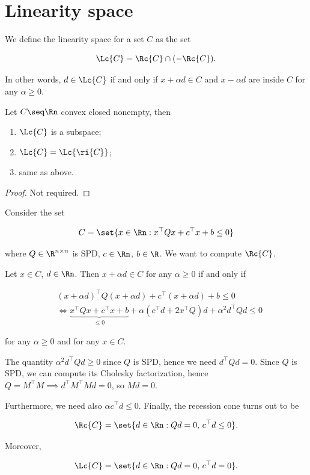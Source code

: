 \section{Linearity space}

We define the linearity space for a set $C$ as the set 

\[ \Lc{C} = \Rc{C} \cap (-\Rc{C}). \]

In other words, $d \in \Lc{C}$ if and only if $x + \alpha d \in C$ and $x - \alpha d$ are inside $C$ for any $\alpha \ge 0$.

\begin{proposition}[Properties of $\Lc{C}$]
    
    Let $C \seq \Rn$ convex closed nonempty, then 

    \begin{enumerate}
        \item $\Lc{C}$ is a subspace;
        \item $\Lc{C} = \Lc{\ri{C}}$;
        \item same as above.
    \end{enumerate}

\end{proposition}

\begin{proof}
    Not required.
\end{proof}

\begin{example}[Important!]
    
    Consider the set 

    \[ C = \set{x \in \Rn : x^\top Q x + c^\top x + b \le 0} \]

    where $Q \in \R^{n \times n}$ is SPD, $c \in \Rn$, $b \in \R$. We want to compute $\Rc{C}$.

    Let $x \in C$, $d \in \Rn$. Then $x + \alpha d \in C$ for any $\alpha \ge 0$ if and only if 

    \begin{align*}
        &(x + \alpha d)^\top Q (x + \alpha d) + c^\top (x + \alpha d) + b \le 0 \\
        &\iff \underbrace{x^\top Q x + c^\top x + b}_{\le 0} + \alpha(c^\top d + 2x^\top Q)d + \alpha^2 d^\top Q d \le 0  
    \end{align*}

    for any $\alpha \ge 0$ and for any $x \in C$.

    The quantity $\alpha^2 d^\top Q d \ge 0$ since $Q$ is SPD, hence we need $d^\top Q d = 0$. Since $Q$ is SPD, we can compute its Cholesky factorization, hence $Q = M^\top M \implies d^\top M^\top M d = 0$, so $Md = 0$. 

    Furthermore, we need also $\alpha c^\top d \le 0$. Finally, the recession cone turns out to be 

    \[ \Rc{C} = \set{d \in \Rn : Qd = 0,\, c^\top d \le 0}. \]

    Moreover, 

    \[ \Lc{C} = \set{d \in \Rn : Qd = 0,\, c^\top d = 0}. \]

\end{example}

